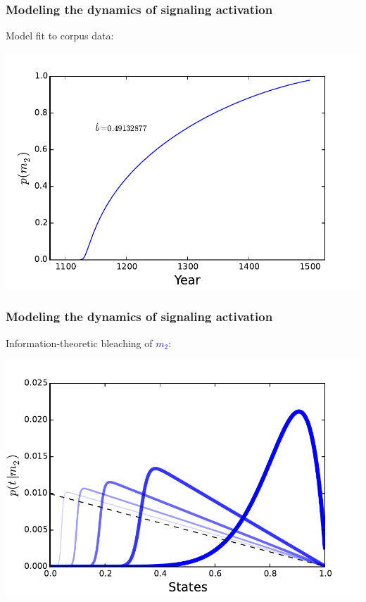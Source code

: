 \documentclass[compress]{beamer}
\begin{document}
\begin{frame}
\frametitle{Modeling the dynamics of signaling activation}
Model fit to corpus data:
	\begin{center}
		\includegraphics[width=.75\textwidth]{m2-sol.pdf}
	\end{center}
\end{frame}


\begin{frame}
\frametitle{Modeling the dynamics of signaling activation}
Information-theoretic bleaching of \textcolor{blue}{$m_2$}:
	\begin{center}
		\includegraphics[width=.7\textwidth]{pt-m2.pdf}
	\end{center}
\end{frame}
\end{document}
